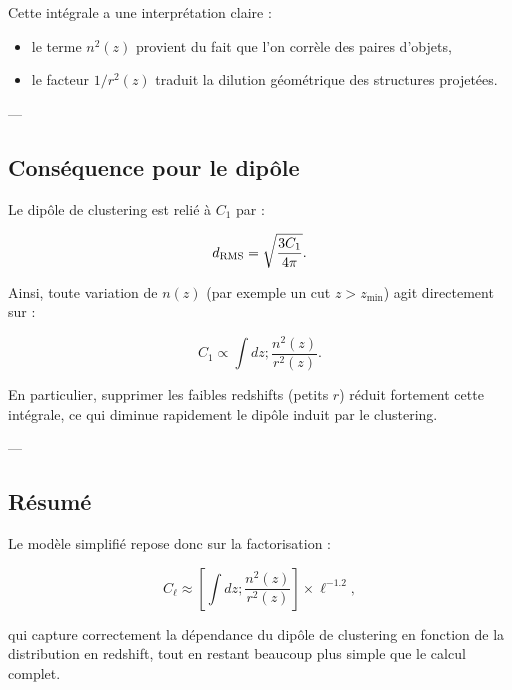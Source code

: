 \documentclass[a4paper,11pt]{article}
\begin{document}
Cette intégrale a une interprétation claire :
\begin{itemize}
\item le terme $n^2(z)$ provient du fait que l'on corrèle des paires d'objets,
\item le facteur $1/r^2(z)$ traduit la dilution géométrique des structures projetées.
\end{itemize}

---

\subsection{Conséquence pour le dipôle}

Le dipôle de clustering est relié à $C_1$ par :

\begin{equation}
d_{\rm RMS} = \sqrt{\frac{3C_1}{4\pi}}.
\end{equation}

Ainsi, toute variation de $n(z)$ (par exemple un cut $z > z_{\min}$) agit directement sur :

\begin{equation}
C_1 \propto \int dz ; \frac{n^2(z)}{r^2(z)}.
\end{equation}

En particulier, supprimer les faibles redshifts (petits $r$) réduit fortement cette intégrale, ce qui diminue rapidement le dipôle induit par le clustering.

---

\subsection{Résumé}

Le modèle simplifié repose donc sur la factorisation :

\begin{equation}
C_\ell \approx \left[\int dz ; \frac{n^2(z)}{r^2(z)}\right] \times \ell^{-1.2},
\end{equation}

qui capture correctement la dépendance du dipôle de clustering en fonction de la distribution en redshift, tout en restant beaucoup plus simple que le calcul complet.
\end{document}
